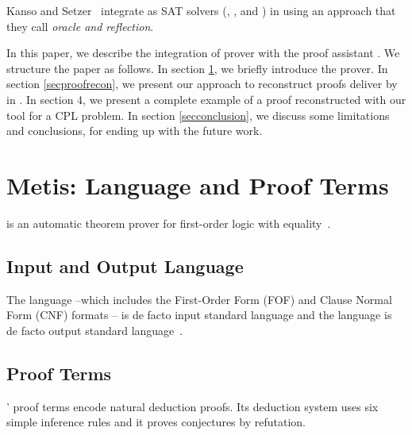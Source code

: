 \documentclass[runningheads,a4paper]{llncs}
\begin{document}
Kanso and Setzer~\cite{kanso2016light} integrate as SAT solvers (,
, and ) in  using an approach that they call
\emph{oracle and reflection}.


In this paper, we describe the integration of  prover with the proof
assistant . We structure the paper as follows. In section \ref{sec2},
we briefly introduce the  prover. In section \ref{secproofrecon},
we present our approach to reconstruct proofs deliver by  in
. In section 4, we present a complete example of a proof
reconstructed with our tool for a CPL problem. In section \ref{secconclusion},
we discuss some limitations and conclusions, for ending up with the future work.

\section{Metis: Language and Proof Terms}\label{sec2}
 is an automatic theorem prover for first-order logic with
equality~\cite{hurd2003first}.

\subsection{Input and Output Language}
The  language --which includes the First-Order Form (FOF) and Clause
Normal Form (CNF) formats \cite{sutcliffe2009} -- is de facto input standard
language and the  language is de facto output standard
language~\cite{sutcliffe2004tstp}.

\subsection{Proof Terms}

' proof terms encode natural deduction proofs. Its deduction system
uses six simple inference rules and it proves conjectures by refutation.
\end{document}
